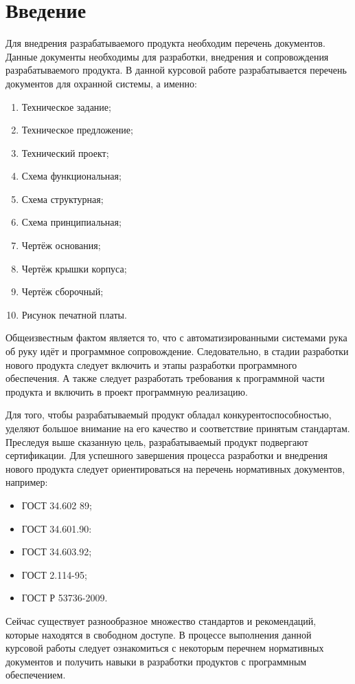 \chapter*{Введение}
Для внедрения разрабатываемого продукта необходим перечень документов.
Данные документы необходимы для разработки, внедрения и сопровождения разрабатываемого продукта.
В данной курсовой работе разрабатывается перечень документов для охранной системы, а именно:
\begin{enumerate}
	\item Техническое задание;
	\item Техническое предложение;
	\item Технический проект;
	\item Схема функциональная;
	\item Схема структурная;
	\item Схема принципиальная;
	\item Чертёж основания;
	\item Чертёж крышки корпуса;
	\item Чертёж сборочный;
	\item Рисунок печатной платы.
\end{enumerate}

Общеизвестным фактом является то, что с автоматизированными системами рука об руку идёт и программное сопровождение.
Следовательно, в стадии разработки нового продукта следует включить и этапы разработки программного обеспечения.
А также следует разработать требования к программной части продукта и включить в проект программную реализацию.

Для того, чтобы разрабатываемый продукт обладал конкурентоспособностью, уделяют большое внимание на его качество и соответствие принятым стандартам.
Преследуя выше сказанную цель, разрабатываемый продукт подвергают сертификации.
Для успешного завершения процесса разработки и внедрения нового продукта следует ориентироваться на перечень нормативных документов, например:
\begin{itemize}
	\item ГОСТ 34.602 89\cite{gost89};
	\item ГОСТ 34.601.90\cite{gost90}:
	\item ГОСТ 34.603.92\cite{gost92};
	\item ГОСТ 2.114-95\cite{gost95};
	\item ГОСТ Р 53736-2009\cite{gost09}.
\end{itemize}

Сейчас существует разнообразное множество стандартов и рекомендаций, которые находятся в свободном доступе.
В процессе выполнения данной курсовой работы следует ознакомиться с некоторым перечнем нормативных документов и получить 
навыки в разработки продуктов с программным обеспечением.
